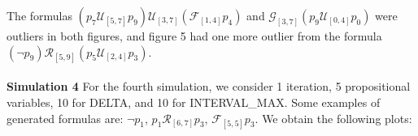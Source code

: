 \documentclass[runningheads]{llncs}
\begin{document}
\vspace{\baselineskip}
The formulas $(p_7 \mathcal{U}_{[5,7]} p_9) \mathcal{U}_{[3,7]} (\mathcal{F}_{[1,4]} p_4)$ and $\mathcal{G}_{[3,7]} (p_9 \mathcal{U}_{[0,4]} p_0)$ were outliers in both figures, and figure 5 had one more outlier from the formula $(\neg p_9) \mathcal{R}_{[5,9]} (p_5 \mathcal{U}_{[2,4]} p_3)$.
\\
\\
\noindent\textbf{Simulation 4}
For the fourth simulation, we consider 1 iteration, 5 propositional variables, 10 for DELTA, and 10 for INTERVAL\_MAX. Some examples of generated formulas are: 
$\neg p_1$, $p_1 \mathcal{R}_{[6,7]} p_3$, $\mathcal{F}_{[5,5]} p_3$.
We obtain the following plots:
\end{document}

